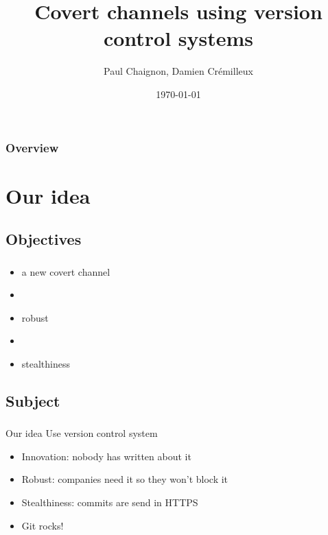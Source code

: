 \documentclass{beamer}
\title[Covert communications]{Covert channels using version control systems} %
\author{Paul Chaignon, Damien Cr\'emilleux} %
\date{\today} %
\begin{document}
\begin{frame}
\titlepage %
\end{frame}

\begin{frame}
\frametitle{Overview} %
\tableofcontents %
\end{frame}





\section{Our idea}

\subsection{Objectives}

\begin{frame}
  \frametitle{\insertsubsectionhead}
  \begin{itemize}
  \item a new covert channel
  \item []
  \item robust
  \item []
  \item stealthiness
  \end{itemize}
\end{frame}

\subsection{Subject}

\begin{frame}
\frametitle{\insertsubsectionhead}

\begin{exampleblock}{Our idea}
Use version control system
\end{exampleblock}

\medskip

\begin{itemize}
\item Innovation: nobody has written about it
\item Robust: companies need it so they won't block it
\item Stealthiness: commits are send  in HTTPS
\item Git rocks!
\end{itemize}
\end{frame}
\end{document}
